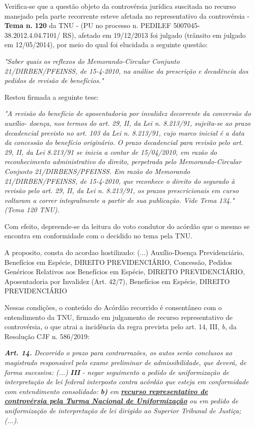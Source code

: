 \documentclass[12pt]{article}
\begin{document}
\justifying
\noindent Verifica-se que a questão objeto da controvérsia jurídica suscitada no recurso manejado pela parte recorrente esteve afetada no representativo da controvérsia - \textbf{Tema n. }\textbf{120} da TNU - (PU no processo n. PEDILEF 5007045-38.2012.4.04.7101/ RS),  afetado em 19/12/2013 foi julgado (trânsito em julgado em 12/05/2014), por meio do qual foi elucidada a seguinte questão:

\noindent \textit{"Saber quais os reflexos do Memorando-Circular Conjunto 21/DIRBEN/PFEINSS, de 15-4-2010, na análise da prescrição e decadência dos pedidos de revisão de benefícios."}

\noindent Restou firmada a seguinte tese:

\noindent \textit{"A revisão do benefício de aposentadoria por invalidez decorrente da conversão do auxílio- doença, nos termos do art. 29, II, da Lei n. 8.213/91, sujeita-se ao prazo decadencial previsto no art. 103 da Lei n. 8.213/91, cujo marco inicial é a data da concessão do benefício originário. O prazo decadencial para revisão pelo art. 29, II, da Lei 8.213/91 se inicia a contar de 15/04/2010, em razão do reconhecimento administrativo do direito, perpetrada pelo Memorando-Circular Conjunto 21/DIRBENS/PFEINSS. Em razão do Memorando 21/DIRBEN/PFEINSS, de 15-4-2010, que reconhece o direito do segurado à revisão pelo art. 29, II, da Lei n. 8.213/91, os prazos prescricionais em curso voltaram a correr integralmente a partir de sua publicação. Vide Tema 134." (Tema 120 TNU).}

\noindent Com efeito, depreende-se da leitura do voto condutor do acórdão que o mesmo se encontra em conformidade com o decidido no  tema pela TNU.

\noindent A proposito, consta do acordao hostilizado: (...) Auxílio-Doença Previdenciário, Benefícios em Espécie, DIREITO PREVIDENCIÁRIO, Concessão, Pedidos Genéricos Relativos aos Benefícios em Espécie, DIREITO PREVIDENCIÁRIO, Aposentadoria por Invalidez (Art. 42/7), Benefícios em Espécie, DIREITO PREVIDENCIÁRIO

\noindent Nessas condições, o conteúdo do Acórdão recorrido é consentâneo com o entendimento da TNU, firmado em julgamento de recurso representativo de controvérsia, o que atrai a incidência da regra prevista pelo art. 14, III, \textit{b,} da Resolução CJF n. 586/2019:

\noindent \textit{\textbf{Art. 14.}}\textit{ Decorrido o prazo para contrarrazões, os autos serão conclusos ao magistrado responsável pelo exame preliminar de admissibilidade, que deverá, de forma sucessiva: (...) }\textit{\textbf{III }}\textit{- negar seguimento a pedido de uniformização de interpretação de lei federal interposto contra acórdão que esteja em conformidade com entendimento consolidado: }\textit{\textbf{b)}}\textit{ em }\uline{\textit{\textbf{recurso representativo de controvérsia pela Turma Nacional de Uniformização}}}\textit{ ou em pedido de uniformização de interpretação de lei dirigido ao Superior Tribunal de Justiça;(...).}
\end{document}
